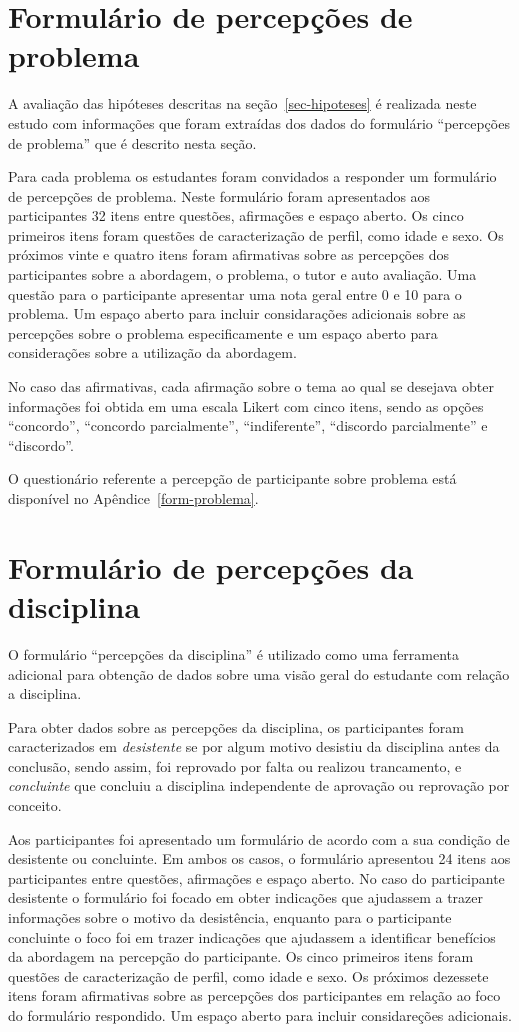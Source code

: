 \section{Formulário de percepções de problema}
\label{form-percepcoes}
A avaliação das hipóteses descritas na seção~\ref{sec-hipoteses} é realizada neste estudo com informações que foram extraídas dos dados do formulário ``percepções de problema'' que é descrito nesta seção.

Para cada problema os estudantes foram convidados a responder um formulário de percepções de problema.
Neste formulário foram apresentados aos participantes 32 itens entre questões, afirmações e espaço aberto.
Os cinco primeiros itens foram questões de caracterização de perfil, como
idade e sexo.
Os próximos vinte e quatro itens foram afirmativas sobre as percepções dos participantes sobre a abordagem, o
problema, o tutor e auto avaliação.
Uma questão para o participante apresentar uma nota geral entre 0 e 10 para o problema.
Um espaço aberto para incluir considarações adicionais sobre
as percepções sobre o problema especificamente e um espaço aberto para considerações
sobre a utilização da abordagem.

No caso das afirmativas, cada afirmação sobre o tema ao qual se desejava obter informações
foi obtida em uma escala Likert com cinco itens,
sendo as opções ``concordo'', ``concordo parcialmente'', ``indiferente'',
``discordo parcialmente'' e ``discordo''.

O questionário referente a percepção de participante sobre problema está disponível no
Apêndice~\ref{form-problema}.

\section{Formulário de percepções da disciplina}
\label{form-disciplinas}
O formulário ``percepções da disciplina'' é utilizado como uma ferramenta adicional para obtenção de dados sobre uma visão geral do estudante com relação a disciplina.

Para obter dados sobre as percepções da disciplina, os participantes foram caracterizados em \textit{desistente}
se por algum motivo desistiu da disciplina antes da conclusão, sendo assim, foi reprovado por
falta ou realizou trancamento, e \textit{concluinte} que concluiu a disciplina independente
de aprovação ou reprovação por conceito.

Aos participantes foi apresentado um formulário de acordo com a sua condição de desistente
ou concluinte.
Em ambos os casos, o formulário apresentou 24 itens aos participantes entre questões,
afirmações e espaço aberto.
No caso do participante desistente o formulário foi focado em obter indicações
que ajudassem a trazer informações sobre o motivo da desistência, enquanto para o participante concluinte
o foco foi em trazer indicações que ajudassem a identificar benefícios da abordagem na percepção
do participante.
Os cinco primeiros itens foram questões de caracterização de perfil, como
idade e sexo.
Os próximos dezessete itens foram afirmativas sobre as percepções dos participantes em
relação ao foco do formulário respondido.
Um espaço aberto para incluir considareções adicionais.

